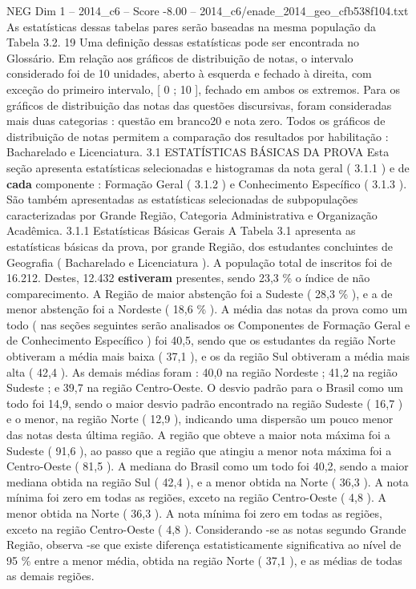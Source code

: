 \begin{textsample}{NEG Dim 1 – 2014\_c6 – Score -8.00 – 2014\_c6/enade\_2014\_geo\_cfb538f104.txt}
As estatísticas dessas tabelas pares serão baseadas na mesma população da Tabela 3.2. 19 Uma definição dessas estatísticas pode ser encontrada no Glossário.
Em relação aos gráficos de distribuição de notas, o intervalo considerado foi de 10 unidades, aberto à esquerda e fechado à direita, com exceção do primeiro intervalo, [ 0 ; 10 ], fechado em ambos os extremos.
Para os gráficos de distribuição das notas das questões discursivas, foram consideradas mais duas categorias : questão em branco20 e nota zero.
Todos os gráficos de distribuição de notas permitem a comparação dos resultados por habilitação : Bacharelado e Licenciatura. 3.1 ESTATÍSTICAS BÁSICAS DA PROVA Esta seção apresenta estatísticas selecionadas e histogramas da nota geral ( 3.1.1 ) e de \textbf{cada} componente : Formação Geral ( 3.1.2 ) e Conhecimento Específico ( 3.1.3 ).
São também apresentadas as estatísticas selecionadas de subpopulações caracterizadas por Grande Região, Categoria Administrativa e Organização Acadêmica. 3.1.1 Estatísticas Básicas Gerais A Tabela 3.1 apresenta as estatísticas básicas da prova, por grande Região, dos estudantes concluintes de Geografia ( Bacharelado e Licenciatura ).
A população total de inscritos foi de 16.212.
Destes, 12.432 \textbf{estiveram} presentes, sendo 23,3 \% o índice de não comparecimento.
A Região de maior abstenção foi a Sudeste ( 28,3 \% ), e a de menor abstenção foi a Nordeste ( 18,6 \% ).
A média das notas da prova como um todo ( nas seções seguintes serão analisados os Componentes de Formação Geral e de Conhecimento Específico ) foi 40,5, sendo que os estudantes da região Norte obtiveram a média mais baixa ( 37,1 ), e os da região Sul obtiveram a média mais alta ( 42,4 ).
As demais médias foram : 40,0 na região Nordeste ; 41,2 na região Sudeste ; e 39,7 na região Centro-Oeste.
O desvio padrão para o Brasil como um todo foi 14,9, sendo o maior desvio padrão encontrado na região Sudeste ( 16,7 ) e o menor, na região Norte ( 12,9 ), indicando uma dispersão um pouco menor das notas desta última região.
A região que obteve a maior nota máxima foi a Sudeste ( 91,6 ), ao passo que a região que atingiu a menor nota máxima foi a Centro-Oeste ( 81,5 ).
A mediana do Brasil como um todo foi 40,2, sendo a maior mediana obtida na região Sul ( 42,4 ), e a menor obtida na Norte ( 36,3 ).
A nota mínima foi zero em todas as regiões, exceto na região Centro-Oeste ( 4,8 ).
A menor obtida na Norte ( 36,3 ).
A nota mínima foi zero em todas as regiões, exceto na região Centro-Oeste ( 4,8 ).
Considerando -se as notas segundo Grande Região, observa -se que existe diferença estatisticamente significativa ao nível de 95 \% entre a menor média, obtida na região Norte ( 37,1 ), e as médias de todas as demais regiões.

\end{textsample}
